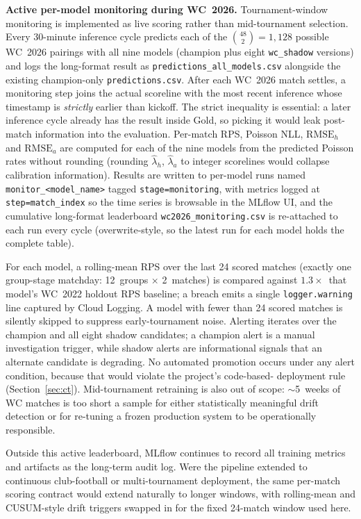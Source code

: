 \documentclass[conference]{IEEEtran}
\begin{document}
\textbf{Active per-model monitoring during WC~2026.}
\label{sec:monitoring_design}%
Tournament-window monitoring is implemented as live scoring rather than
mid-tournament selection. Every 30-minute inference cycle predicts each
of the $\binom{48}{2}=1{,}128$ possible WC~2026 pairings with all nine
models (champion plus eight \texttt{wc\_shadow} versions) and logs the
long-format result as \texttt{predictions\_all\_models.csv} alongside
the existing champion-only \texttt{predictions.csv}. After each WC~2026
match settles, a monitoring step joins the actual scoreline with the
most recent inference whose timestamp is \emph{strictly} earlier than
kickoff. The strict inequality is essential: a later inference cycle
already has the result inside Gold, so picking it would leak post-match
information into the evaluation. Per-match RPS, Poisson NLL,
$\text{RMSE}_{h}$ and $\text{RMSE}_{a}$ are computed for each of the
nine models from the predicted Poisson rates without rounding (rounding
$\hat{\lambda}_h$, $\hat{\lambda}_a$ to integer scorelines would
collapse calibration information). Results are written to per-model
runs named \texttt{monitor\_<model\_name>} tagged
\texttt{stage=monitoring}, with metrics logged at \texttt{step=match\_index}
so the time series is browsable in the MLflow UI, and the cumulative
long-format leaderboard \texttt{wc2026\_monitoring.csv} is re-attached
to each run every cycle (overwrite-style, so the latest run for each
model holds the complete table).

For each model, a rolling-mean RPS over the last 24 scored matches
(exactly one group-stage matchday: 12~groups $\times$ 2~matches) is compared against
$1.3 \times$~that model's WC~2022 holdout RPS baseline; a breach emits
a single \texttt{logger.warning} line captured by Cloud Logging. A
model with fewer than 24 scored matches is silently skipped to suppress
early-tournament noise. Alerting iterates over the champion and all
eight shadow candidates; a champion alert is a manual investigation
trigger, while shadow alerts are informational signals that an
alternate candidate is degrading. No automated promotion occurs under
any alert condition, because that would violate the project's code-based-
deployment rule (Section~\ref{sec:ct}). Mid-tournament retraining is
also out of scope: $\sim$5~weeks of WC matches is too short a sample
for either statistically meaningful drift detection or for re-tuning a
frozen production system to be operationally responsible.

Outside this active leaderboard, MLflow continues to record all
training metrics and artifacts as the long-term audit log. Were the
pipeline extended to continuous club-football or multi-tournament
deployment, the same per-match scoring contract would extend naturally
to longer windows, with rolling-mean and CUSUM-style drift triggers
swapped in for the fixed 24-match window used here.
\end{document}
